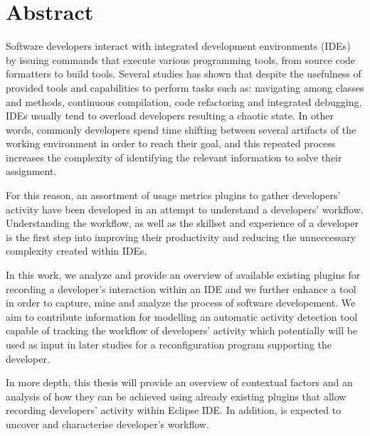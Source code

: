 \chapter{Abstract}



Software developers interact with integrated development environments (IDEs) by issuing commands that execute various programming tools, from source code formatters to build tools. Several studies has shown that despite the usefulness of provided tools and capabilities to perform tasks such as: navigating among classes and methods, continuous compilation, code refactoring and integrated debugging, IDEs usually tend to overload developers resulting a chaotic state. In other words, commonly developers spend time shifting between several artifacts of the working environment in order to reach their goal, and this repeated process increases the complexity of identifying the relevant information to solve their assignment. 

For this reason, an assortment of usage metrics plugins to gather developers' activity have been developed in an attempt to understand a developers' workflow. Understanding the workflow, as well as the skillset and experience of a developer is the first step into improving their productivity and reducing the unneccessary complexity created within IDEs. 

In this work, we analyze and provide an overview of available existing plugins for recording a developer's interaction within an IDE and we further enhance a tool in order to capture, mine and analyze the process of software developement. We aim to contribute information for modelling an automatic activity detection tool capable of tracking the workflow of developers’ activity which potentially will be used as input in later studies for a reconfiguration program supporting the developer.

In more depth, this thesis will provide an overview of contextual factors and an analysis of how they can be achieved using already existing plugins that allow recording developers’ activity within Eclipse IDE. In addition, is expected to uncover and characterise developer’s workflow.

